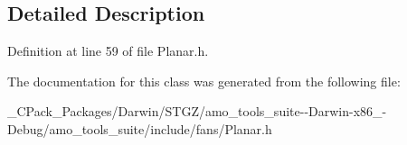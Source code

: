 \subsection{Detailed Description}


Definition at line 59 of file Planar.\+h.



The documentation for this class was generated from the following file\+:\begin{DoxyCompactItemize}
\item 
\+\_\+\+C\+Pack\+\_\+\+Packages/\+Darwin/\+S\+T\+G\+Z/amo\+\_\+tools\+\_\+suite-\/-\/\+Darwin-\/x86\+\_-\/\+Debug/amo\+\_\+tools\+\_\+suite/include/fans/Planar.\+h\end{DoxyCompactItemize}
